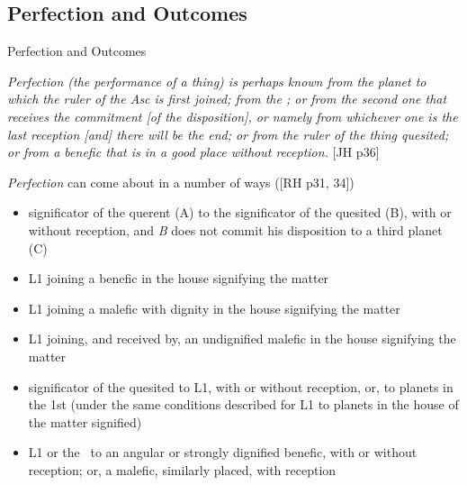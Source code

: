 \subsection{Perfection and Outcomes}
\begin{frame}[t]{Perfection and Outcomes}
\begin{block}{}
\textsl{Perfection (the performance of a thing) is perhaps known from the planet to which the ruler of the Asc is first joined; from the \Moon; or from the second one that receives the commitment [of the disposition], or namely from whichever one is the last reception [and] there will be the end; or from the ruler of the thing quesited; or from a benefic that is in a good place without reception.} [JH p36]
\end{block}
\textsl{Perfection} can come about in a number of ways ([RH p31, 34])
\small
\begin{itemize}
\item significator of the querent (A) to the significator of the quesited (B), with or without reception, and \textsl{B} does not commit his disposition to a third planet (C)
\item L1 joining a benefic in the house signifying the matter
\item L1 joining a malefic with dignity in the house signifying the matter
\item L1 joining, and received by, an undignified malefic in the house signifying the matter
\item significator of the quesited to L1, with or without reception, or, to planets in the 1st (under the same conditions described for L1 to planets in the house of the matter signified)
\item L1 or the \Moon\ to an angular or strongly dignified benefic, with or without reception; or, a malefic, similarly placed, with reception
\end{itemize}
\end{frame}

